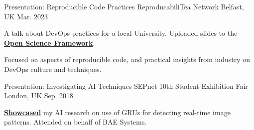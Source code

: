 
\begin{cventries}

  \cventry
  	{Presentation: Reproducible Code Practices} %
  	{ReproducabiliTea Network} %
    {Belfast, UK} %
    {Mar. 2023} %
   {
      \begin{cvitems} %
        \item A talk about DevOps practices for a local University. Uploaded slides to the \href{https://osf.io/yma2d}{\textbf{Open Science Framework}}.
        \item Focused on aspects of reproducible code, and practical insights from industry on DevOps culture and techniques.
      \end{cvitems}
    }

    
  \cventry
	{Presentation: Investigating AI Techniques}
    {SEPnet 10th Student Exhibition Fair} 
    {London, UK} %
    {Sep. 2018} %
    {
      \begin{cvitems} %
        \item \href{https://kiersz.dev/resources/bae-poster.pdf}{\textbf{Showcased}} my AI research on use of GRUs for detecting real-time image patterns. Attended on behalf of BAE Systems.
      \end{cvitems}
    }

\end{cventries}

